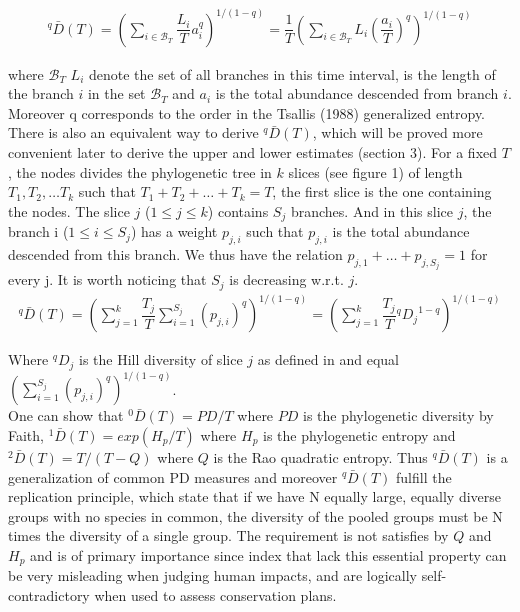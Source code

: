 \documentclass{article}
\begin{document}
\begin{align}
 ^q \bar{D} (T) 
 =\left( \sum_{i \in \mathcal{B}_T} \dfrac{L_i}{T} a_i^q  \right)^{1/(1-q)}
 = \dfrac{1}{T}\left( \sum_{i \in \mathcal{B}_T} L_i \left( \dfrac{a_i}{T} \right)^q  \right)^{1/(1-q)}
 \end{align}

 where $\mathcal{B}_T$ $L_i$ denote the set of all branches in this time interval, is the length of the branch $i$ in the set $\mathcal{B}_T$ and $a_i$ is the total abundance descended from branch $i$. Moreover  q corresponds to the order in the Tsallis (1988) generalized entropy. \\
 
 There is also an equivalent way to derive $ ^q \bar{D} (T)$, which will be proved more convenient later to derive the upper and lower estimates (section 3).
 For a fixed $T$, the nodes divides the phylogenetic tree in $k$ slices (see figure 1) of length $T_1,T_2,\ldots T_k$ such that $T_1+T_2+\ldots +T_k=T$, the first slice is the one containing the nodes. 
 The slice $j$ ($1 \leq j \leq k$) contains $S_j$ branches. And in this slice $j$, the branch i ($1 \leq i \leq S_j$) has a weight $p_{j,i}$ such that $p_{j,i}$ is the total abundance descended from this branch. We thus have the relation $p_{j,1}+\ldots+p_{j,S_j}=1$ for every j. It is worth noticing that $S_j$ is decreasing w.r.t. $j$. 
  \begin{align} \label{ultraPD}
 ^q \bar{D} (T) 
 =\left( \sum_{j=1}^k \dfrac{T_j}{T}\sum_{i=1}^{S_j} (p_{j,i})^q \right)^{1/(1-q)}
 =\left( \sum_{j=1}^k \dfrac{T_j}{T} {^q D_j}^{1-q} \right)^{1/(1-q)}
 \end{align}

Where $^qD_j$ is the Hill diversity of slice $j$ as defined in \cite{Haegeman2013} and equal $\left( \sum_{i=1}^{S_j} (p_{j,i})^q \right)^{1/(1-q)}$.\\

One can show that  $^0 \bar{D} (T)=PD/T$ where $PD$ is the phylogenetic diversity by Faith, $^1 \bar{D} (T)=exp(H_p/T)$ where $H_p$ is the phylogenetic entropy and $^2 \bar{D} (T)=T/(T-Q)$ where $Q$ is the Rao quadratic entropy. 
Thus $^q \bar{D} (T)$ is a generalization of common PD measures and moreover $^q \bar{D} (T)$ fulfill the replication principle, which state that if we have N equally large, equally diverse groups with no species in common, the diversity of the pooled groups must be N times the diversity of a single group. 
The requirement is not satisfies by $Q$ and $H_p$ and is of primary importance since index that lack this essential property can be very misleading when judging human impacts, and are logically self-contradictory when used to assess conservation plans. 
\end{document}
